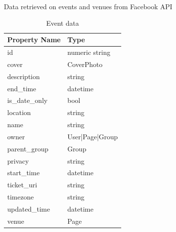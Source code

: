 		\begin{table}[h]
			\caption{Data retrieved on events and venues from Facebook API}
				\begin{minipage}{.5\linewidth}
					\caption{Event data}
					\centering
					    \begin{tabular}{|l|l|}
					     \hline
					    Property Name  & Type            \\ \hline
					    id             & numeric string  \\
					    cover          & CoverPhoto      \\
					    description    & string          \\
					    end\_time      & datetime        \\
					    is\_date\_only & bool            \\
					    location       & string          \\
					    name           & string          \\
					    owner          & User|Page|Group \\
					    parent\_group  & Group           \\
					    privacy        & string          \\
					    start\_time    & datetime        \\
					    ticket\_uri    & string          \\
					    timezone       & string          \\
					    updated\_time  & datetime        \\
					    venue          & Page            \\
					    \hline
						\end{tabular}


\end{minipage}
\end{table}
